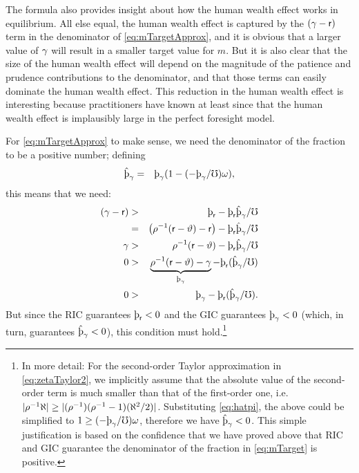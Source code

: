 \documentclass{handout}
\begin{document}
The formula also provides insight about how the human wealth effect
works in equilibrium.  All else equal, the human wealth effect is captured
by the $(\gamma-\mathsf{r})$ term in the denominator of \eqref{eq:mTargetApprox},
and it is obvious that a larger value of $\gamma$ will result in a smaller
target value for $m$.  But it is also clear that the size of the human wealth
effect will depend on the magnitude of the patience and prudence contributions
to the denominator, and that those terms can easily dominate the human wealth
effect.  This reduction in the human wealth effect is interesting because practitioners have known at least since
\cite{summersCapTax} that the human wealth effect is implausibly large in the
perfect foresight model.

For \eqref{eq:mTargetApprox} to make sense, we need
the denominator of the fraction to be a positive number;
defining
\begin{eqnarray}
  \patpGrohat & = & \patpGro(1-(-\patpGro/\urate)\prudEx),
\end{eqnarray}
this means that we need:
\begin{eqnarray}
    (\pGro - \rfree) & > & \patr - \patr\patpGrohat/\urate
\\   & = & \left(\CRRA^{-1}(\rfree-\timeRate)-\rfree\right)-  \patr\patpGrohat/\urate
\\ \pGro & > & \CRRA^{-1}(\rfree-\timeRate)-  \patr\patpGrohat/\urate
\\ 0 & > & \underbrace{\CRRA^{-1}(\rfree-\timeRate) - \pGro}_{\patpGro} -  \patr(\patpGrohat/\urate)
\\ 0 & > & \patpGro -  \patr(\patpGrohat/\urate) \label{eq:newDenom}
.
\end{eqnarray}
But since the RIC guarantees $\patr<0$ and the GIC guarantees $\patpGro<0$ (which, in turn, guarantees $\patpGrohat < 0$), this condition must hold.\footnote{In more detail: For the second-order Taylor approximation in \eqref{eq:zetaTaylor2}, we implicitly assume that the absolute value of the second-order term is much smaller than that of the first-order one, i.e. $|\rho^{-1} \aleph | \geq |(\rho^{-1})(\rho^{-1}-1)(\aleph^{2}/2)|$. Substituting \eqref{eq:hatpi}, the above could be simplified to $1 \geq (-\patpGro/\urate)\prudEx$, therefore we have $\patpGrohat < 0$. This simple justification is based on the confidence that we have proved above that RIC and GIC guarantee the denominator of the fraction in \eqref{eq:mTarget} is positive.}
\end{document}
